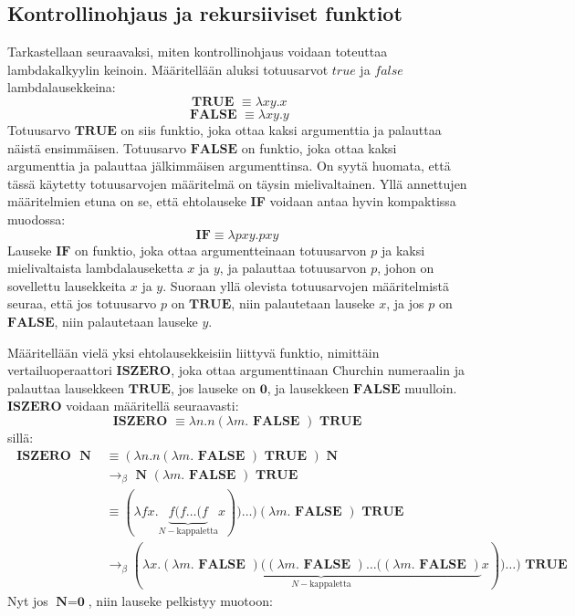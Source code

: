 \subsection{Kontrollinohjaus ja rekursiiviset funktiot}
Tarkastellaan seuraavaksi, miten kontrollinohjaus voidaan toteuttaa lambdakalkyylin keinoin. Määritellään aluksi totuusarvot $true$ ja $false$ lambdalausekkeina:
\[ \textbf{ TRUE } \equiv \lambda x y . x \]
\[ \textbf{ FALSE } \equiv \lambda x y . y \]
Totuusarvo $\textbf{TRUE}$ on siis funktio, joka ottaa kaksi argumenttia ja palauttaa näistä ensimmäisen. Totuusarvo $\textbf{FALSE}$ on funktio, joka ottaa kaksi argumenttia ja palauttaa jälkimmäisen argumenttinsa. On syytä huomata, että tässä käytetty totuusarvojen määritelmä on täysin mielivaltainen. Yllä annettujen määritelmien etuna on se, että ehtolauseke \textbf{IF} voidaan antaa hyvin kompaktissa muodossa:
\[ \textbf{IF} \equiv \lambda p x y . p x y \]  
Lauseke $\textbf{IF}$ on funktio, joka ottaa argumentteinaan totuusarvon $p$ ja kaksi mielivaltaista lambdalauseketta $x$ ja $y$, ja palauttaa totuusarvon $p$, johon on sovellettu lausekkeita $x$ ja $y$. Suoraan yllä olevista totuusarvojen määritelmistä seuraa, että jos totuusarvo $p$ on $\textbf{TRUE}$, niin palautetaan lauseke $x$, ja jos $p$ on $\textbf{FALSE}$, niin palautetaan lauseke $y$.
\par 
Määritellään vielä yksi ehtolausekkeisiin liittyvä funktio, nimittäin vertailuoperaattori $\textbf{ISZERO}$, joka ottaa argumenttinaan Churchin numeraalin ja palauttaa lausekkeen $\textbf{TRUE}$, jos lauseke on $\textbf{0}$, ja lausekkeen $\textbf{FALSE}$ muulloin. $\textbf{ISZERO}$ voidaan määritellä seuraavasti:
\[\textbf{ ISZERO } \equiv \lambda n . n (\lambda m . \textbf{ FALSE }) \textbf{ TRUE }  \]
sillä:
\begin{align*}
\textbf{ ISZERO } \textbf{ N }
&\equiv (\lambda n . n (\lambda m . \textbf{ FALSE }) \textbf{ TRUE }) \textbf{ N } \\
&\rightarrow_{\beta} \textbf{ N } (\lambda m . \textbf{ FALSE }) \textbf{ TRUE } \\
&\equiv (\lambda fx . \underbrace{ f ( f \ldots (f }_{ N-\text{kappaletta}} x)) \ldots )  (\lambda m . \textbf{ FALSE }) \textbf{ TRUE } \\
&\rightarrow_{\beta} (\lambda x . \underbrace{ (\lambda m . \textbf{ FALSE }) ( (\lambda m . \textbf{ FALSE }) \ldots ((\lambda m . \textbf{ FALSE }) }_{ N-\text{kappaletta}} x)) \ldots ) \textbf{ TRUE }
\end{align*} 
Nyt jos $\textbf{N} = \textbf{0}$, niin lauseke pelkistyy muotoon:
